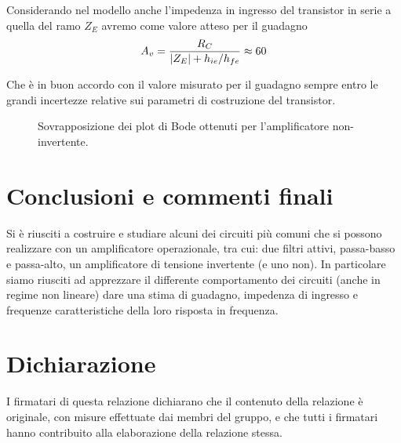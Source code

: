 \documentclass[10pt,a4paper]{article}
\begin{document}
Considerando nel modello anche l'impedenza in ingresso del transistor in
serie a quella del ramo $Z_E$ avremo come valore atteso per il guadagno
\begin{equation}
A_v = \frac{R_C}{\left| Z_E \right| + h_{ie}/h_{fe}} \approx 60
\end{equation}

Che è in buon accordo con il valore misurato per il guadagno sempre
entro le grandi incertezze relative sui parametri di costruzione del
transistor.
\fi
\begin{figure}[htbp]
\centering
\caption{Sovrapposizione dei plot di Bode ottenuti per l'amplificatore
non-invertente. \label{fig: prdbode}}
\end{figure}

\section*{Conclusioni e commenti finali}
Si è riusciti a costruire e studiare alcuni dei circuiti più comuni che si
possono realizzare con un amplificatore operazionale, tra cui: due filtri
attivi, passa-basso e passa-alto, un amplificatore di tensione invertente
(e uno non).
In particolare siamo riusciti ad apprezzare il differente comportamento dei
circuiti (anche in regime non lineare) dare una stima di guadagno, impedenza di
ingresso e frequenze caratteristiche della loro risposta in frequenza.

\section*{Dichiarazione}
I firmatari di questa relazione dichiarano che il contenuto della relazione \`e
originale, con misure effettuate dai membri del gruppo, e che tutti i firmatari
hanno contribuito alla elaborazione della relazione stessa.
\end{document}
